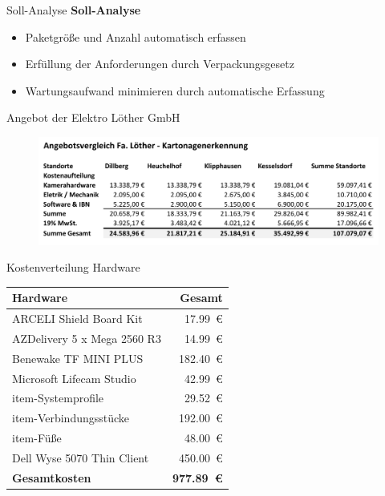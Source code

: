 \documentclass[10pt,ngerman]{beamer}
\begin{document}
\begin{frame}[fragile]{Soll-Analyse}
  \textbf{Soll-Analyse}
  \begin{itemize}
    \item Paketgröße und Anzahl automatisch erfassen
          \pause
    \item Erfüllung der Anforderungen durch Verpackungsgesetz
          \pause
    \item Wartungsaufwand minimieren durch automatische Erfassung
  \end{itemize}
\end{frame}


\begin{frame}[fragile]{Angebot der Elektro Löther GmbH}
  \begin{figure}[htpb]
    \centering
    \includegraphics[width=1\textwidth]{pics/AngebotLoether.png}
  \end{figure}
\end{frame}


\begin{frame}[fragile]{Kostenverteilung Hardware}
  \begin{table}[htbp]
    \centering
    \begin{tabular}{lr}
      \textbf{Hardware}           & \textbf{Gesamt}         \\ \hline
      ARCELI Shield Board Kit     & \SI{17.99}{€}           \\
      AZDelivery 5 x Mega 2560 R3 & \SI{14.99}{€}           \\
      Benewake TF MINI PLUS       & \SI{182.40}{€}          \\
      Microsoft Lifecam Studio    & \SI{42.99}{€}           \\
      item-Systemprofile          & \SI{29.52}{€}           \\
      item-Verbindungsstücke      & \SI{192.00}{€}          \\
      item-Füße                   & \SI{48.00}{€}           \\
      Dell Wyse 5070 Thin Client  & \SI{450.00}{€}          \\
      \hline
      \textbf{Gesamtkosten}       & \textbf{\SI{977.89}{€}}
    \end{tabular}
  \end{table}
\end{frame}
\end{document}
